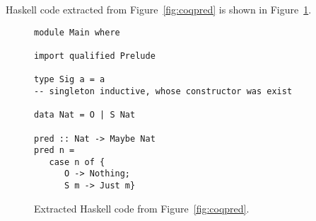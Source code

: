Haskell code extracted from Figure~\ref{fig:coqpred} is shown in
Figure~\ref{fig:extcode}.
\begin{figure}[h]
\begin{lstlisting}
module Main where

import qualified Prelude

type Sig a = a
-- singleton inductive, whose constructor was exist

data Nat = O | S Nat

pred :: Nat -> Maybe Nat
pred n =
   case n of {
      O -> Nothing;
      S m -> Just m}
\end{lstlisting}
\centering
\caption{Extracted Haskell code from Figure~\ref{fig:coqpred}.}
\label{fig:extcode}
\end{figure}





